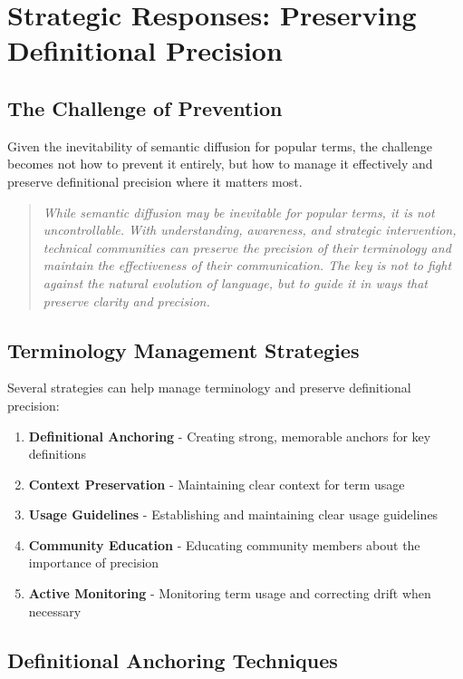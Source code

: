 \documentclass[11pt]{article}
\begin{document}
\section{Strategic Responses: Preserving Definitional Precision}

\subsection{The Challenge of Prevention}

Given the inevitability of semantic diffusion for popular terms, the challenge becomes not how to prevent it entirely, but how to manage it effectively and preserve definitional precision where it matters most.

\begin{quote}
\emph{While semantic diffusion may be inevitable for popular terms, it is not uncontrollable. With understanding, awareness, and strategic intervention, technical communities can preserve the precision of their terminology and maintain the effectiveness of their communication. The key is not to fight against the natural evolution of language, but to guide it in ways that preserve clarity and precision.}
\end{quote}

\subsection{Terminology Management Strategies}

Several strategies can help manage terminology and preserve definitional precision:

\begin{enumerate}
\item \textbf{Definitional Anchoring} - Creating strong, memorable anchors for key definitions
\item \textbf{Context Preservation} - Maintaining clear context for term usage
\item \textbf{Usage Guidelines} - Establishing and maintaining clear usage guidelines
\item \textbf{Community Education} - Educating community members about the importance of precision
\item \textbf{Active Monitoring} - Monitoring term usage and correcting drift when necessary
\end{enumerate}

\subsection{Definitional Anchoring Techniques}
\end{document}
